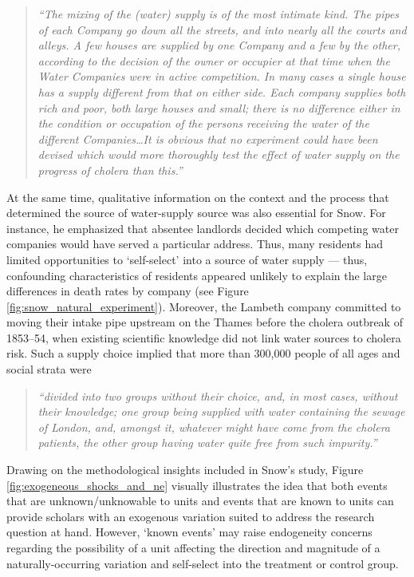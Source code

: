 \documentclass[11pt]{article}
\begin{document}
\begin{refsection}
\begin{quote}
  \textit{
  ``The mixing of the (water) supply is of the most intimate kind. The pipes of
  each Company go down all the streets, and into nearly all the courts and
  alleys. A few houses are supplied by one Company and a few by the other,
  according to the decision of the owner or occupier at that time when the Water
  Companies were in active competition. In many cases a single house has a
  supply different from that on either side. Each company supplies both rich and
  poor, both large houses and small; there is no difference either in the
  condition or occupation of the persons receiving the water of the different
  Companies\ldots It is obvious that no experiment could have been devised which
  would more thoroughly test the effect of water supply on the progress of
  cholera than this.''
  }
  \autocite[][pages 74 - 75]{snow_1855}
\end{quote}

At the same time, qualitative information on the context and the process that
determined the source of water-supply source was also essential for Snow.  For
instance, he emphasized that absentee landlords decided which competing water
companies would have served a particular address.  Thus, many residents had
limited opportunities to `self-select' into a source of water supply --- thus,
confounding characteristics of residents appeared unlikely to explain the large
differences in death rates by company (see Figure
\ref{fig:snow_natural_experiment}).  Moreover,  the Lambeth company committed to
moving their intake pipe upstream on the Thames before the cholera outbreak of
1853–54, when existing scientific knowledge did not link water sources to
cholera risk.  Such a supply choice implied that more than 300,000 people of 
all ages and social strata were

\begin{quote}
  \textit{``divided into two groups without their choice, and, in most cases, 
  without their knowledge; one group being supplied with water containing the 
  sewage of London, and, amongst it, whatever might have come from the cholera 
  patients, the other group having water quite free from such impurity.''}
  \autocite[][pages 74–75]{snow_1855}
\end{quote}

Drawing on the methodological insights included in Snow's study, Figure 
\ref{fig:exogeneous_shocks_and_ne} visually illustrates the idea that both
events that are unknown/unknowable to units and events that are known to units
can provide scholars with an exogenous variation suited to address the research 
question at hand.  However, `known events' may raise endogeneity concerns
regarding the possibility of a unit affecting the direction and magnitude of a
naturally-occurring variation and self-select into the treatment or control
group.


\end{refsection}
\end{document}
